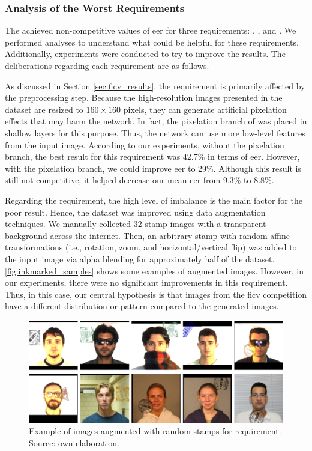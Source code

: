 
 
\subsubsection{Analysis of the Worst Requirements}
 
The \methodname achieved non-competitive values of \acs{eer} for three requirements: \inkmarked, \pixelation, and \otherfacesortoys. We performed analyses to understand what could be helpful for these requirements. Additionally, experiments were conducted to try to improve the results. The deliberations regarding each requirement are as follows.
 
As discussed in Section \ref{sec:ficv_results}, the \pixelation requirement is primarily affected by the preprocessing step. Because the high-resolution images presented in the dataset are resized to $160 \times 160$ pixels, they can generate artificial pixelation effects that may harm the network. In fact, the pixelation branch of \methodname was placed in shallow layers for this purpose. Thus, the network can use more low-level features from the input image. According to our experiments, without the pixelation branch, the best result for this requirement was 42.7\% in terms of \acs{eer}. However, with the pixelation branch, we could improve \acs{eer} to 29\%. Although this result is still not competitive, it helped decrease our mean \acs{eer} from 9.3\% to 8.8\%.
 
Regarding the \inkmarked requirement, the high level of imbalance is the main factor for the poor result. Hence, the dataset was improved using data augmentation techniques. We manually collected 32 stamp images with a transparent background across the internet. Then, an arbitrary stamp with random affine transformations (i.e., rotation, zoom, and horizontal/vertical flip) was added to the input image via alpha blending for approximately half of the dataset. \autoref{fig:inkmarked_samples} shows some examples of augmented images. However, in our experiments, there were no significant improvements in this requirement. Thus, in this case, our central hypothesis is that images from the \acs{ficv} competition have a different distribution or pattern compared to the generated images.
 
\begin{figure}[htb]
\centering
\includegraphics[width=\linewidth]{images/reqs/inkmarked/inkmarked_samples.pdf}
\caption{Example of images augmented with random stamps for \inkmarked requirement. Source: own elaboration.}
\label{fig:inkmarked_samples}
\end{figure}
 
